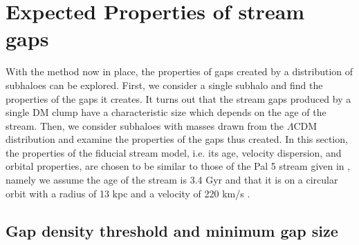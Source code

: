 \documentclass[useAMS,usenatbib]{mn2e}
\begin{document}
\section{Expected Properties of stream gaps} \label{sec:gap_properties}

With the method now in place, the properties of gaps created by a distribution of subhaloes can be explored. First, we consider a single subhalo and find the properties of the gaps it creates. It turns out that the stream gaps produced by a single DM clump have a characteristic size which depends on the age of the stream. Then, we consider subhaloes with masses drawn from the $\Lambda$CDM distribution and examine the properties of the gaps thus created. In this section, the properties of the fiducial stream model, i.e. its age, velocity dispersion, and orbital properties, are chosen to be similar to those of the Pal 5 stream given in \cite{kuepper_et_al_pal5}, namely we assume the age of the stream is 3.4 Gyr and that it is on a circular orbit with a radius of 13 kpc and a velocity of 220 km/s \citep{bovy_et_al_2012}.


\subsection{Gap density threshold and minimum gap size} 
\end{document}
